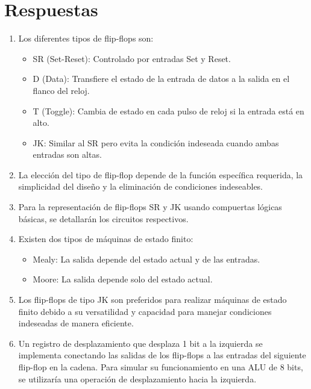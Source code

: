 \documentclass{article}
\begin{document}
\section*{Respuestas}

\begin{enumerate}
    \item Los diferentes tipos de flip-flops son:
    \begin{itemize}
        \item SR (Set-Reset): Controlado por entradas Set y Reset.
        \item D (Data): Transfiere el estado de la entrada de datos a la salida en el flanco del reloj.
        \item T (Toggle): Cambia de estado en cada pulso de reloj si la entrada está en alto.
        \item JK: Similar al SR pero evita la condición indeseada cuando ambas entradas son altas.
    \end{itemize}
    
    \item La elección del tipo de flip-flop depende de la función específica requerida, la simplicidad del diseño y la eliminación de condiciones indeseables.
    
    \item Para la representación de flip-flops SR y JK usando compuertas lógicas básicas, se detallarán los circuitos respectivos.
    
    \item Existen dos tipos de máquinas de estado finito:
    \begin{itemize}
        \item Mealy: La salida depende del estado actual y de las entradas.
        \item Moore: La salida depende solo del estado actual.
    \end{itemize}
    
    \item Los flip-flops de tipo JK son preferidos para realizar máquinas de estado finito debido a su versatilidad y capacidad para manejar condiciones indeseadas de manera eficiente.
    
    \item Un registro de desplazamiento que desplaza 1 bit a la izquierda se implementa conectando las salidas de los flip-flops a las entradas del siguiente flip-flop en la cadena. Para simular su funcionamiento en una ALU de 8 bits, se utilizaría una operación de desplazamiento hacia la izquierda.
\end{enumerate}
\end{document}
